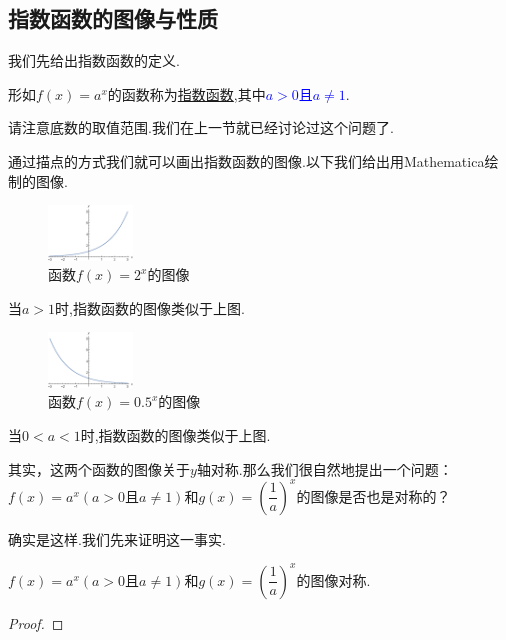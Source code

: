 \documentclass[lang=cn,math=cm,chinesefont=nofont,11pt,scheme=chinese,twocol]{elegantbook}
\begin{document}
\subsection{指数函数的图像与性质}

我们先给出指数函数的定义.

\begin{definition}
  形如$f(x)=a^x$的函数称为\underline{指数函数},其中\textcolor{blue}{$a>0$且$a\neq 1$}.
\end{definition}

请注意底数的取值范围.我们在上一节就已经讨论过这个问题了.

通过描点的方式我们就可以画出指数函数的图像.以下我们给出用Mathematica绘制的图像.

\begin{figure}[h]
  \centering
  \includegraphics[width=0.2\textwidth]{image/2.4function1.eps}
  \caption{函数$f(x)=2^x$的图像}
  \label{2.4function1}
\end{figure}

当$a>1$时,指数函数的图像类似于上图.

\begin{figure}[h]
  \centering
  \includegraphics[width=0.2\textwidth]{image/2.4function2.eps}
  \caption{函数$f(x)=0.5^x$的图像}
  \label{2.2.4function2}
\end{figure}

当$0<a<1$时,指数函数的图像类似于上图.

其实，这两个函数的图像关于$y$轴对称.那么我们很自然地提出一个问题：$f(x)=a^x(a>0\text{且}a\neq 1)$和$g(x)=(\dfrac{1}{a})^x$的图像是否也是对称的？

确实是这样.我们先来证明这一事实.

\begin{proposition}
  $f(x)=a^x(a>0\text{且}a\neq 1)$和$g(x)=(\dfrac{1}{a})^x$的图像对称.
\end{proposition}

\begin{proof}
  
\end{proof}
\end{document}
